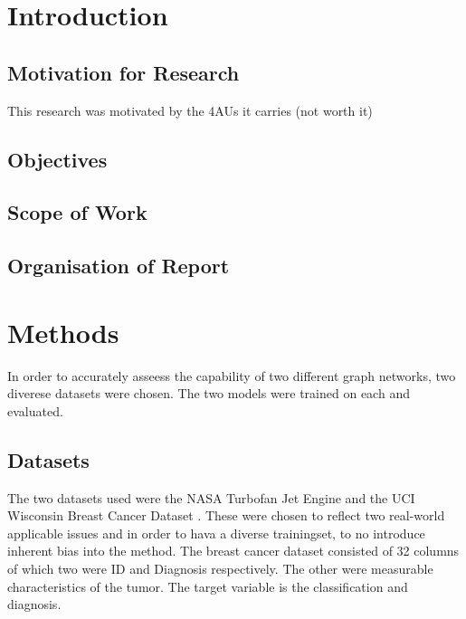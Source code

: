 \documentclass[12pt]{article}
\begin{document}
\pagebreak
\renewcommand{\cftdotsep}{0.5}
\renewcommand{\cftsecleader}{\cftdotfill{\cftdotsep}}
\renewcommand{\contentsname}{Table of Contents}  %
\setlength{\cftbeforesecskip}{10pt}   %
\setlength{\cftbeforesubsecskip}{10pt} %
\setlength{\cftbeforesubsubsecskip}{10pt} %
\renewcommand{\cftsecpresnum}{Chapter~} %
\renewcommand{\cftsecaftersnum}{\quad} 
\setlength{\cftsecnumwidth}{6.1em}   %
\tableofcontents

\pagebreak
{}
\section{Introduction}

\subsection{Motivation for Research}

This research was motivated by the 4AUs it carries (not worth it)

\subsection{Objectives}

\subsection{Scope of Work}

\subsection{Organisation of Report}

\pagebreak
\section{Methods}
In order to accurately asseess the capability of two different graph networks, two diverese datasets were chosen. The two models were trained on each and evaluated.

\subsection{Datasets} %
The two datasets used were the NASA Turbofan Jet Engine and the UCI Wisconsin Breast Cancer Dataset . These were chosen to reflect two real-world applicable issues and in order to hava a diverse trainingset, to no introduce inherent bias into the method.
The breast cancer dataset consisted of 32 columns of which two were ID and Diagnosis respectively. The other were measurable characteristics of the tumor. The target variable is the classification and diagnosis.
\end{document}
